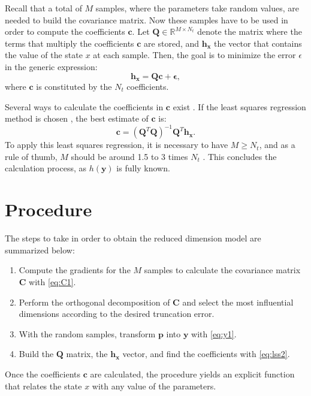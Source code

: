 Recall that a total of $M$ samples, where the parameters take random values, are needed to build the covariance matrix. Now these samples have to be used in order to compute the coefficients $\mathbf{c}$. Let $\mathbf{Q} \in \mathbb{R}^{M \times N_t}$ denote the matrix where the terms that multiply the coefficients $\mathbf{c}$ are stored, and $\mathbf{h_x}$ the vector that contains the value of the state $x$ at each sample. Then, the goal is to minimize the error $\epsilon$ in the generic expression:
\begin{equation}
  \mathbf{h_x} = \mathbf{Q} \mathbf{c} + \mathbf{\epsilon},
  \label{eq:lss}
\end{equation}
where $\mathbf{c}$ is constituted by the $N_t$ coefficients. 

Several ways to calculate the coefficients in $\mathbf{c}$ exist \cite{shen2020}. If the least squares regression method is chosen \cite{shin2016}, the best estimate of $\mathbf{c}$ is: 
\begin{equation}
  \mathbf{c} = \left(\mathbf{Q}^T \mathbf{Q}\right)^{-1} \mathbf{Q}^T \mathbf{h_x}.
  \label{eq:lss2}
\end{equation}
To apply this least squares regression, it is necessary to have $M \geq N_t$, and as a rule of thumb, $M$ should be around 1.5 to 3 times $N_t$ \cite{shin2016}. This concludes the calculation process, as $h(\mathbf{y})$ is fully known. 


\section{Procedure}\label{sec:process}
The steps to take in order to obtain the reduced dimension model are summarized below:
\begin{enumerate}
  \item Compute the gradients for the $M$ samples to calculate the covariance matrix $\mathbf{C}$ with \eqref{eq:C1}. 
  \item Perform the orthogonal decomposition of $\mathbf{C}$ and select the most influential dimensions according to the desired truncation error. 
  \item With the random samples, transform $\mathbf{p}$ into $\mathbf{y}$ with \eqref{eq:y1}. 
  \item Build the $\mathbf{Q}$ matrix, the $\mathbf{h_x}$ vector, and find the coefficients with \eqref{eq:lss2}. 
\end{enumerate}
Once the coefficients $\mathbf{c}$ are calculated, the procedure yields an explicit function that relates the state $x$ with any value of the parameters. 

